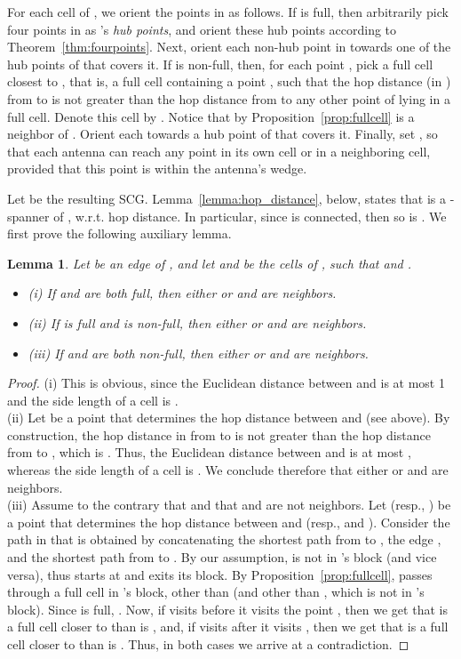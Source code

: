 \documentclass[11pt,letter]{article}
\newtheorem{lemma}[theorem]{Lemma}
\begin{document}
For each cell  of ,
we orient the points in  as follows.
If  is full, then arbitrarily pick four points in  as 's {\em hub points},
and orient these hub points according to Theorem~\ref{thm:fourpoints}.
Next, orient each non-hub point in  towards one of the hub points of  that covers it.
If  is non-full, then, for each point ,
pick a full cell closest to ,
that is, a full cell containing a point , such that the hop distance (in ) from  to  is not greater than the hop distance from  to any other point of  lying in a full cell.
Denote this cell by .
Notice that by Proposition~\ref{prop:fullcell}  is a neighbor of .
Orient each  towards a hub point of  that covers it.
Finally, set , so that each antenna can reach any point in its own cell or in a neighboring cell, provided that this point is within the antenna's wedge.

Let  be the resulting SCG.
Lemma~\ref{lemma:hop_distance}, below, states that  is a -spanner of , w.r.t. hop distance.
In particular, since  is connected, then so is .
We first prove the following auxiliary lemma.

\begin{lemma}
\label{lemma:neighboring}
Let  be an edge of ,
and let  and  be the cells of , such that  and .
\begin{itemize}
	\item[]
	(i)  	If  and  are both full, then either  or  and  are neighbors.
	\item[]
	(ii) 	If  is full and  is non-full, then either  or  and  are neighbors.
	\item[]
	(iii) If  and  are both non-full, then either  or  and  are neighbors.
\end{itemize}			
\end{lemma}

\begin{proof}
(i) This is obvious, since the Euclidean distance between  and  is at most 1 and the side length of a cell is .
\\
(ii) Let  be a point that determines the hop distance between  and  (see above).
By construction, the hop distance in  from  to  is not greater than the hop distance from  to , which is .
Thus, the Euclidean distance between  and  is at most , whereas the side length of a cell is .
We conclude therefore that either  or  and  are neighbors.
\\
(iii) Assume to the contrary that  and that  and  are not neighbors.
Let  (resp., ) be a point that determines the hop distance between  and  (resp.,  and ).
Consider the path  in  that is obtained by concatenating the shortest path from  to , the edge , and the shortest path from  to .
By our assumption,
 is not in 's block (and vice versa),
thus  starts at  and exits its block. By
Proposition~\ref{prop:fullcell},
 passes through a full cell  in 's block,
other than  (and other than , which is not in 's block).
Since  is full, . Now, if  visits  before it visits the point ,
then we get that  is a full cell closer to  than is , and, if  visits  after it visits ,
then we get that  is a full cell closer to  than is . Thus,
in both cases we arrive at a contradiction.
\end{proof}
\end{document}
